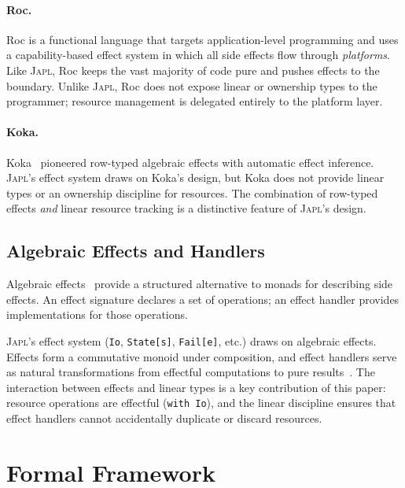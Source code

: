 \documentclass[11pt]{article}
\newcommand{\JAPL}{\textsc{Japl}}
\begin{document}
\paragraph{Roc.}
Roc is a functional language that targets application-level programming
and uses a capability-based effect system in which all side effects
flow through \emph{platforms}.  Like \JAPL{}, Roc keeps the vast
majority of code pure and pushes effects to the boundary.  Unlike
\JAPL{}, Roc does not expose linear or ownership types to the
programmer; resource management is delegated entirely to the platform
layer.

\paragraph{Koka.}
Koka~\cite{leijen2017koka} pioneered row-typed algebraic effects with
automatic effect inference.  \JAPL{}'s effect system draws on Koka's
design, but Koka does not provide linear types or an ownership
discipline for resources.  The combination of row-typed effects
\emph{and} linear resource tracking is a distinctive feature of
\JAPL{}'s design.

\subsection{Algebraic Effects and Handlers}

Algebraic effects~\cite{plotkin2009handlers,bauer2015programming} provide a
structured alternative to monads for describing side effects.  An
effect signature declares a set of operations; an effect handler
provides implementations for those operations.

\JAPL{}'s effect system (\texttt{Io}, \texttt{State[s]},
\texttt{Fail[e]}, etc.) draws on algebraic effects.  Effects form a
commutative monoid under composition, and effect handlers serve as
natural transformations from effectful computations to pure
results~\cite{kammar2013handlers}.  The interaction between effects and
linear types is a key contribution of this paper: resource operations
are effectful (\texttt{with Io}), and the linear discipline ensures
that effect handlers cannot accidentally duplicate or discard
resources.


\section{Formal Framework}\label{sec:formal}
\end{document}
